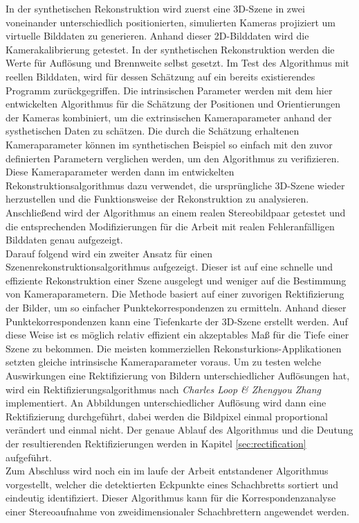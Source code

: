 In der synthetischen Rekonstruktion wird zuerst eine 3D-Szene in zwei voneinander unterschiedlich positionierten, simulierten Kameras projiziert um virtuelle Bilddaten zu generieren. Anhand dieser 2D-Bilddaten wird die Kamerakalibrierung getestet. In der synthetischen Rekonstruktion werden die Werte für Auflösung und Brennweite selbst gesetzt. Im Test des Algorithmus mit reellen Bilddaten, wird für dessen Schätzung auf ein bereits existierendes Programm zurückgegriffen. Die intrinsischen Parameter werden mit dem hier entwickelten Algorithmus für die Schätzung der Positionen und Orientierungen der Kameras kombiniert, um die extrinsischen Kameraparameter anhand der systhetischen Daten zu schätzen.  Die durch die Schätzung erhaltenen Kameraparameter können im synthetischen Beispiel so einfach mit den zuvor definierten Parametern verglichen werden, um den Algorithmus zu verifizieren. Diese Kameraparameter werden dann im entwickelten Rekonstruktionsalgorithmus dazu verwendet, die ursprüngliche 3D-Szene wieder herzustellen und die Funktionsweise der Rekonstruktion zu analysieren. Anschließend wird der Algorithmus an einem realen Stereobildpaar getestet und die entsprechenden Modifizierungen für die Arbeit mit realen Fehleranfälligen Bilddaten genau aufgezeigt. \\

Darauf folgend wird ein zweiter Ansatz für einen Szenenrekonstruktionsalgorithmus aufgezeigt. Dieser ist auf eine schnelle und effiziente Rekonstruktion einer Szene ausgelegt und weniger auf die Bestimmung von Kameraparametern. Die Methode basiert auf einer zuvorigen Rektifizierung der Bilder, um so einfacher Punktekorrespondenzen zu ermitteln. Anhand dieser Punktekorrespondenzen kann eine Tiefenkarte der 3D-Szene erstellt werden. Auf diese Weise ist es möglich relativ effizient ein akzeptables Maß für die Tiefe einer Szene zu bekommen. Die meisten kommerziellen Rekonsturkions-Applikationen setzten gleiche intrinsische Kameraparameter voraus. Um zu testen welche Auswirkungen eine Rektifizierung von Bildern unterschiedlicher Auflösungen hat, wird ein Rektifizierungsalgorithmus nach \textit{Charles Loop \& Zhengyou Zhang} implementiert. An Abbildungen unterschiedlicher Auflösung wird dann eine Rektifizierung durchgeführt, dabei werden die Bildpixel einmal proportional verändert und einmal nicht. Der genaue Ablauf des Algorithmus und die Deutung der resultierenden Rektifizierungen werden in Kapitel \ref{sec:rectification} aufgeführt.\\

Zum Abschluss wird noch ein im laufe der Arbeit entstandener Algorithmus vorgestellt, welcher die detektierten Eckpunkte eines Schachbretts sortiert und eindeutig identifiziert. Dieser Algorithmus kann für die Korrespondenzanalyse einer Stereoaufnahme von zweidimensionaler Schachbrettern angewendet werden.


